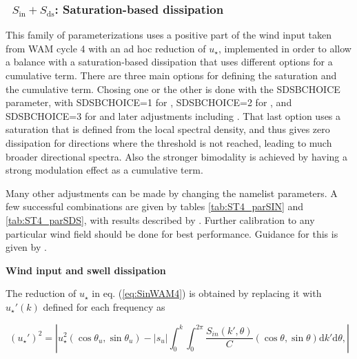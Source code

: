 \vsssub
\subsubsection{~$S_{\mathrm{in}} + S_{\mathrm{ds}}$: Saturation-based dissipation} \label{sec:ST4}
\vsssub


\noindent 
This family of parameterizations uses a positive part of the wind input taken
from WAM cycle 4 with an ad hoc reduction of $u_\star$, implemented in
order to allow a balance with a saturation-based dissipation that uses different options for 
a cumulative term. There are three main options for defining the saturation and the cumulative term. Chosing one or the other is done with the  {\F SDSBCHOICE} parameter, with  {\F SDSBCHOICE=1} for \cite{art:Aea10},  {\F SDSBCHOICE=2} for \cite{Filipot&Ardhuin2012}, and {\F SDSBCHOICE=3} for \cite{Romero2019} and later adjustments including \cite{art:AA23}. That last option uses a saturation that is defined from the local spectral density, and thus gives zero dissipation for directions where the threshold is not reached, leading to much broader directional spectra. Also the stronger bimodality is achieved by having a strong modulation effect as a cumulative term. 

Many other adjustments can be made by changing the namelist parameters. A few successful combinations 
are given by tables \ref{tab:ST4_parSIN} and \ref{tab:ST4_parSDS}, with results described by \citep{art:RA13,art:SAG16,art:AA23}.
Further calibration to any particular wind field should be done for best performance. Guidance for this is given by \cite{Stopa2018}. 

\vsssub
\textbf{Wind input and swell dissipation} 
\vsssub


The reduction of $u_\star$ in
eq. (\ref{eq:SinWAM4}) is obtained by replacing it with $u_\star '(k)$ defined for each
frequency as

\begin{equation}
\left(u_\star '\right)^2=\left|u_\star^2 \left(\cos \theta_u, \sin
\theta_u \right) - \left|s_u\right| \int_0^k \int_0^{2 \pi}
\frac{S_{in}\left(k',\theta \right)}{C}  \left(\cos \theta, \sin
\theta \right)  {\mathrm d} k' \mathrm d
\theta,\label{ustarp}\right|
\end{equation}

